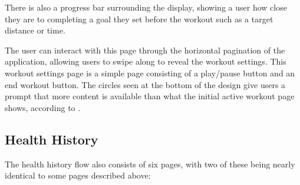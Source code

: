 \documentclass{l4proj}
\begin{document}
There is also a progress bar surrounding the display, showing a user how close they are to completing a goal they set before the workout such as a target distance or time.

The user can interact with this page through the horizontal pagination of the application, allowing users to swipe along to reveal the workout settings. This workout settings page is a simple page consisting of a play/pause button and an end workout button. The circles seen at the bottom of the design give users a prompt that more content is available than what the initial active workout page shows, according to \cite{PageIndicators}. 

\subsection{Health History}
\label{sec:healthhistory}

The health history flow also consists of six pages, with two of these being nearly identical to some pages described above:
\end{document}
